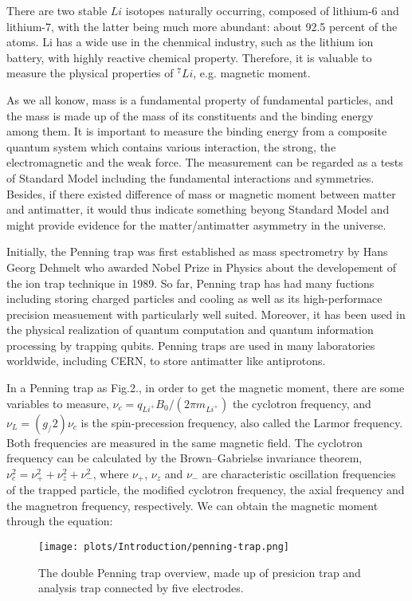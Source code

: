 There are two stable $Li$ isotopes naturally occurring, composed of lithium-6 and lithium-7, with the latter being much more abundant: about 92.5 percent of the atoms. Li has a wide use in the chenmical industry, such as the lithium ion battery, with highly reactive chemical property. Therefore, it is valuable to measure the physical properties of ${}^{7}Li$, e.g. magnetic moment.

As we all konow, mass is a fundamental property of fundamental particles, and the mass is made up of the mass of its constituents and the binding energy among them. It is important to measure the binding energy from a composite quantum system which contains various interaction, the strong, the electromagnetic and the weak force. The measurement can be regarded as a tests of Standard Model including the fundamental interactions and symmetries. Besides, if there existed difference of mass or magnetic moment between matter and antimatter, it would thus indicate something beyong Standard Model and might provide evidence for the matter/antimatter asymmetry in the universe. 

Initially, the Penning trap was first established as mass spectrometry by Hans Georg Dehmelt\cite{wiki.Penning} who awarded Nobel Prize in Physics about the developement of the ion trap technique in 1989. So far, Penning trap has had many fuctions including storing charged particles and cooling as well as its high-performace precision measuement with particularly well suited. Moreover, it has been used in the physical realization of quantum computation and quantum information processing by trapping qubits. Penning traps are used in many laboratories worldwide, including CERN, to store antimatter like antiprotons.  

In a Penning trap as Fig.2., in order to get the magnetic moment, there are some variables to measure, $\nu_{c}=q_{Li^{+}}B_{0}/(2\pi m_{Li^{+}})$ the cyclotron frequency, and $\nu_{L}=(g_/2)\nu_{c}$ is the spin-precession frequency, also called the Larmor frequency. Both frequencies are measured in the same magnetic field. The cyclotron frequency can be calculated by the Brown–Gabrielse invariance theorem, $\nu_c^{2}=\nu_{+}^2+\nu_{z}^2+\nu_{-}^2$, where $\nu_{+}$, $\nu_{z}$ and $\nu_{-}$ are characteristic oscillation frequencies of the trapped particle, the modified cyclotron frequency, the axial frequency and the magnetron frequency, respectively. We can obtain the magnetic moment through the equation:

\begin{figure}[]
\begin{center}
\texttt{[image: plots/Introduction/penning-trap.png]}
\end{center}
\caption{The double Penning trap overview, made up of presicion trap and analysis trap connected by five electrodes.}
\label{fig:penning-trap}
\end{figure}

